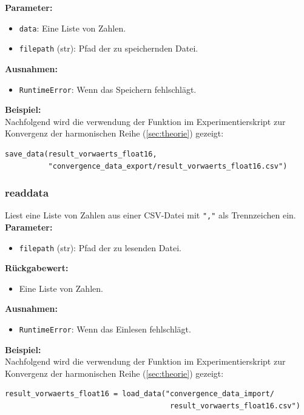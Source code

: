 \documentclass{scrreprt}
\begin{document}
\noindent \textbf{Parameter:}
\begin{itemize}
    \item \texttt{data}: Eine Liste von Zahlen.
    \item \texttt{filepath} (str): Pfad der zu speichernden Datei.
\end{itemize}

\noindent \textbf{Ausnahmen:}
\begin{itemize}
    \item \texttt{RuntimeError}: Wenn das Speichern fehlschlägt.
\end{itemize}

\noindent \textbf{Beispiel:} \\
Nachfolgend wird die verwendung der Funktion im Experimentierskript zur Konvergenz der harmonischen Reihe (\autoref{sec:theorie}) gezeigt:
\begin{lstlisting}
save_data(result_vorwaerts_float16,
          "convergence_data_export/result_vorwaerts_float16.csv")
\end{lstlisting}

\vspace{10mm}

\subsubsection{read\textunderscore data}
Liest eine Liste von Zahlen aus einer CSV-Datei mit \texttt{","} als Trennzeichen ein. \\

\noindent \textbf{Parameter:}
\begin{itemize}
    \item \texttt{filepath} (str): Pfad der zu lesenden Datei.
\end{itemize}

\noindent \textbf{Rückgabewert:}
\begin{itemize}
    \item Eine Liste von Zahlen.
\end{itemize}

\noindent \textbf{Ausnahmen:}
\begin{itemize}
    \item \texttt{RuntimeError}: Wenn das Einlesen fehlschlägt.
\end{itemize}

\noindent \textbf{Beispiel:} \\
Nachfolgend wird die verwendung der Funktion im Experimentierskript zur Konvergenz der harmonischen Reihe (\autoref{sec:theorie}) gezeigt:
\begin{lstlisting}
result_vorwaerts_float16 = load_data("convergence_data_import/
                                      result_vorwaerts_float16.csv")
\end{lstlisting}
\end{document}

